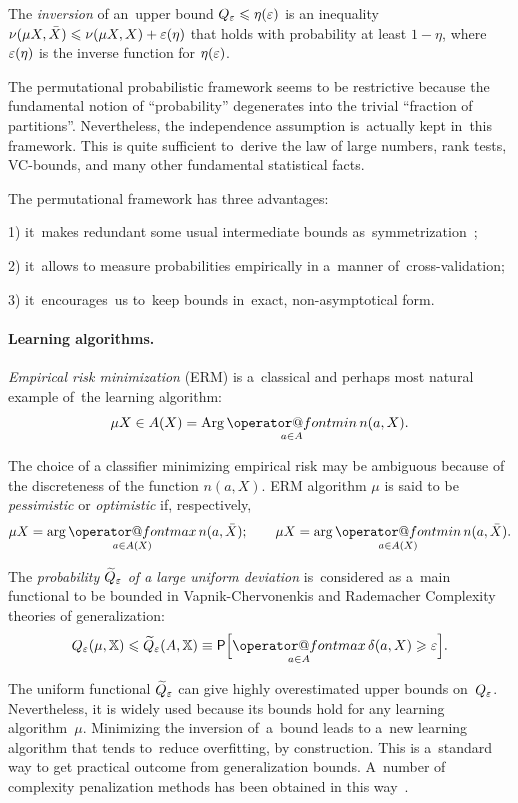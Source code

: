 \documentclass{article}
\makeatletter
\let\cite\citep
\def\XX{\mathbb{X}}
\newcommand{\X}{\bar X}
\renewcommand{\geq}{\geqslant}
\renewcommand{\leq}{\leqslant}
\renewcommand{\max}{\mathop{\operator@font max}\limits}
\renewcommand{\min}{\mathop{\operator@font min}\limits}
\newcommand{\Arg}{\mathop{\rm Arg}\limits}
\newcommand{\wtil}{\widetilde}
\newcommand{\eqdef}{\equiv}
\providecommand{\Prob}{\mathsf{P}}
\renewcommand{\emph}[1]{\textit{#1}}
\makeatother
\begin{document}
The \emph{inversion} of an~upper bound $Q_\eps \leq \eta(\eps)$  is an inequality
$\nu(\mu X,\X) \leq \nu(\mu X, X) + \eps(\eta)$
that holds with probability at least $1-\eta$, where $\varepsilon(\eta)$
is the inverse function for $\eta(\varepsilon)$.

\medskip
The permutational probabilistic framework seems to be restrictive because
the fundamental notion of ``probability'' degenerates into the trivial ``fraction of partitions''.
Nevertheless, the  independence assumption is~actually kept in~this framework.
This is quite sufficient to~derive
the law of large numbers, rank tests, VC-bounds, and many other fundamental statistical facts.

\medskip
The permutational framework has three advantages:

1) it~makes redundant some usual intermediate bounds as~symmetrization~\cite{philips05datadependent};

2) it~allows to measure probabilities empirically in a~manner of~cross-validation;

3) it~encourages~us to~keep bounds in~exact, non-asymptotical form.

\paragraph{Learning algorithms.}%
\emph{Empirical risk minimization} (ERM) is a~classical and perhaps most natural example of~the learning algorithm:
\begin{equation}
\label{ERM}
	 \mu X \in A(X) = \Arg\min_{a\in A} n(a,X).
\end{equation}

The choice of a classifier minimizing empirical risk may be ambiguous
because of the discreteness of the function $n(a,X)$.
ERM algorithm $\mu$ is said to be \emph{pessimistic} or \emph{optimistic} if, respectively,
\[
    \mu X = \arg\max_{a\in A(X)} n(a,\X);
    \qquad
    \mu X = \arg\min_{a\in A(X)} n(a,\X).
\]

The \emph{probability $\wtil Q_\eps$ of a large uniform deviation}
is~considered as a~main functional to be bounded
in Vapnik-Chervonenkis and Rademacher Complexity theories of generalization:
\begin{equation}
\label{eq:Quniform}
    Q_\eps(\mu, \XX)
    \leq
    \wtil Q_\eps(A, \XX)
    \eqdef
    \Prob
    \Bigl[
        \max_{a\in A} \delta(a,X) \geq \eps
    \Bigr].
\end{equation}

The uniform functional $\wtil Q_\eps$ can give highly overestimated upper bounds on~$Q_\varepsilon$.
Nevertheless, it is widely used because its bounds hold for any learning algorithm~$\mu$.
Minimizing the inversion of~a~bound leads
to a~new learning algorithm that tends to~reduce overfitting, by construction.
This is a~standard way to get practical outcome from generalization bounds.
A~number of complexity penalization methods has been obtained
in this way~\cite{vapnik98stat,langford02quantitatively}.
\end{document}

